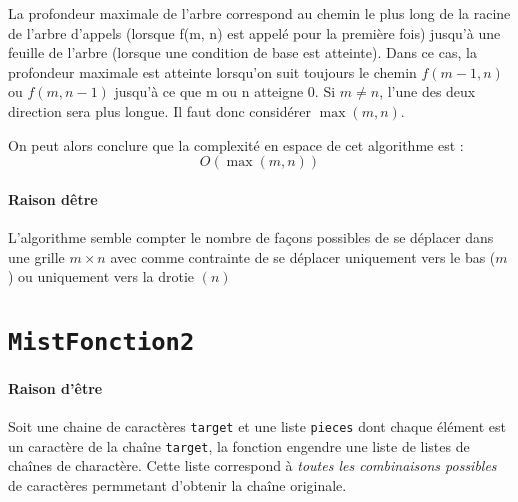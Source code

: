 \documentclass[9pt]{report}
\begin{document}
\begin{multicols*}{2}
  
  La profondeur maximale de l'arbre correspond 
  au chemin le plus long de la racine de l'arbre d'appels (lorsque f(m, n) 
  est appelé pour la première fois) jusqu'à une feuille de l'arbre 
  (lorsque une condition de base est atteinte). 
  Dans ce cas, la profondeur maximale est atteinte lorsqu'on 
  suit toujours le chemin $f(m - 1, n)  $ou $f(m, n - 1)$ jusqu'à
  ce que m ou n atteigne 0. Si $m \neq n$, l'une des deux direction sera plus longue. 
  Il faut donc considérer $\max(m, n)$. 

  On peut alors conclure que la complexité
  en espace de cet algorithme est : 
  \[ O(\max(m, n)) \]


  \paragraph{Raison dêtre}
  L'algorithme semble compter le nombre de façons possibles de se déplacer 
  dans une grille $m \times n$ avec comme contrainte de se déplacer uniquement 
  vers le bas ($m$) ou uniquement vers la drotie $(n)$
  \section{\texttt{MistFonction2}} 
  \paragraph{Raison d'être}
  Soit une chaine de caractères \texttt{target} et une liste 
  \texttt{pieces} dont chaque élément est un caractère de  
  la chaîne \texttt{target}, la fonction engendre une 
  liste de listes de chaînes de charactère. Cette liste correspond 
  à \textit{toutes les combinaisons possibles} de caractères permmetant 
  d'obtenir la chaîne originale. 


\end{multicols*}
\end{document}
